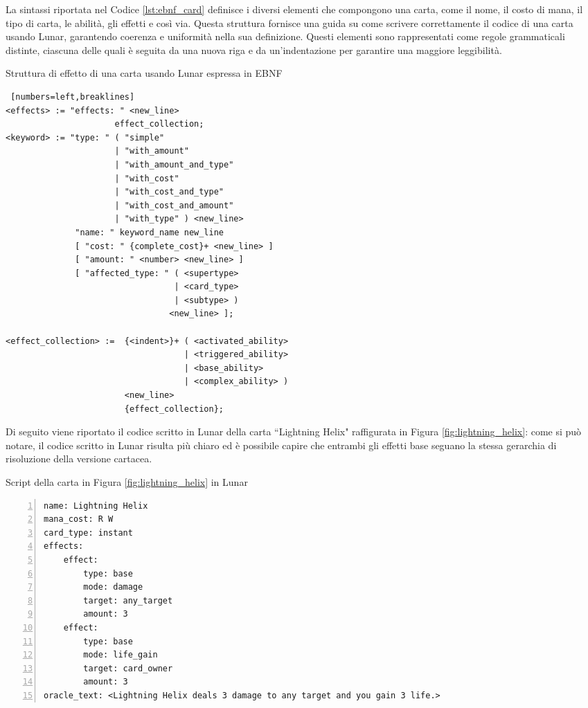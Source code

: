 La sintassi riportata nel Codice \ref{lst:ebnf_card} definisce i diversi elementi che compongono una carta, come il nome, il costo di mana, il tipo di carta, le abilità, gli effetti e così via. Questa struttura fornisce una guida su come scrivere correttamente il codice di una carta usando Lunar, garantendo coerenza e uniformità nella sua definizione.
Questi elementi sono rappresentati come regole grammaticali distinte, ciascuna delle quali è seguita da una nuova riga e da un'indentazione per garantire una maggiore leggibilità.\newline\newline\newline


\begin{algorithm}[!ht]
	\caption{Struttura di effetto di una carta usando Lunar espressa in EBNF}
	\label{lst:ebnf_effect}
    \footnotesize
	\begin{Verbatim} [numbers=left,breaklines]
<effects> := "effects: " <new_line>
                      effect_collection;
<keyword> := "type: " ( "simple" 
                      | "with_amount" 
                      | "with_amount_and_type" 
                      | "with_cost" 
                      | "with_cost_and_type" 
                      | "with_cost_and_amount"
                      | "with_type" ) <new_line>
              "name: " keyword_name new_line
              [ "cost: " {complete_cost}+ <new_line> ]
              [ "amount: " <number> <new_line> ]
              [ "affected_type: " ( <supertype> 
                                  | <card_type> 
                                  | <subtype> ) 
                                 <new_line> ];
         
<effect_collection> :=  {<indent>}+ ( <activated_ability> 
                                    | <triggered_ability>
                                    | <base_ability>
                                    | <complex_ability> ) 
                        <new_line> 
                        {effect_collection};
    \end{Verbatim}
\end{algorithm}

 Di seguito viene riportato il codice scritto in Lunar della carta ``Lightning Helix" raffigurata in Figura \ref{fig:lightning_helix}: come si può notare, il codice scritto in Lunar risulta più chiaro ed è possibile capire che entrambi gli effetti base seguano la stessa gerarchia di risoluzione della versione cartacea.

\begin{algorithm}[!ht]
	\caption{Script della carta in Figura \ref{fig:lightning_helix} in Lunar}
	\label{lst:lightning_helix_ln}
    \footnotesize
	\begin{Verbatim}[numbers=left,breaklines]
name: Lightning Helix
mana_cost: R W
card_type: instant
effects:
    effect:
        type: base
        mode: damage
        target: any_target
        amount: 3
    effect:
        type: base
        mode: life_gain
        target: card_owner
        amount: 3
oracle_text: <Lightning Helix deals 3 damage to any target and you gain 3 life.>
	\end{Verbatim}
\end{algorithm}


